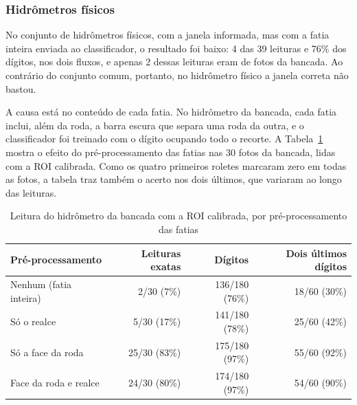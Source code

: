 \subsubsection{Hidrômetros físicos}
\label{subsubsec:resultado_fisico}

No conjunto de hidrômetros físicos, com a janela informada, mas com a fatia inteira enviada ao classificador, o resultado
foi baixo: 4 das 39 leituras e 76\% dos dígitos, nos dois fluxos, e apenas 2 dessas
leituras eram de fotos da bancada. Ao contrário do conjunto comum, portanto, no hidrômetro físico a
janela correta não bastou.

A causa está no conteúdo de cada fatia. No hidrômetro da bancada, cada fatia inclui, além
da roda, a barra escura que separa uma roda da outra, e o classificador foi treinado com o
dígito ocupando todo o recorte. A Tabela~\ref{tab:resultado_fisico_face} mostra o efeito do
pré-processamento das fatias nas 30 fotos da bancada, lidas com a ROI calibrada. Como os
quatro primeiros roletes marcaram zero em todas as fotos, a tabela traz também o acerto nos
dois últimos, que variaram ao longo das leituras.

\begin{table}[H]
    \centering
    \caption{Leitura do hidrômetro da bancada com a ROI calibrada, por pré-processamento das fatias}
    \label{tab:resultado_fisico_face}
    \begin{tabularx}{\textwidth}{@{}>{\raggedright\arraybackslash}Xrrr@{}}
        \toprule
        \textbf{Pré-processamento} & \textbf{Leituras exatas} & \textbf{Dígitos} & \textbf{Dois últimos dígitos} \\
        \midrule
        Nenhum (fatia inteira)  & 2/30 (7\%)  & 136/180 (76\%) & 18/60 (30\%) \\
        Só o realce             & 5/30 (17\%) & 141/180 (78\%) & 25/60 (42\%) \\
        Só a face da roda       & 25/30 (83\%) & 175/180 (97\%) & 55/60 (92\%) \\
        Face da roda e realce   & 24/30 (80\%) & 174/180 (97\%) & 54/60 (90\%) \\
        \bottomrule
    \end{tabularx}
\end{table}


